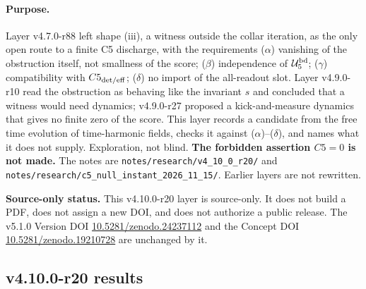 \paragraph{Purpose.}
Layer v4.7.0-r88 left shape (iii), a witness outside the collar iteration, as the only open route to a finite C5 discharge, with
the requirements (\(\alpha\)) vanishing of the obstruction itself, not smallness of the score; (\(\beta\)) independence of
\(\mathcal U_5^{\rm bd}\); (\(\gamma\)) compatibility with \(C5_{\rm det/eff}\); (\(\delta\)) no import of the all-readout slot.  Layer
v4.9.0-r10 read the obstruction as behaving like the invariant \(s\) and concluded that a witness would need dynamics; v4.9.0-r27
proposed a kick-and-measure dynamics that gives no finite zero of the score.  This layer records a candidate from the free time
evolution of time-harmonic fields, checks it against (\(\alpha\))--(\(\delta\)), and names what it does not supply.  Exploration, not
blind.  \textbf{The forbidden assertion \(C5=0\) is not made.}  The notes are
\texttt{notes/\allowbreak research/\allowbreak v4\_10\_0\_r20/} and
\texttt{notes/\allowbreak research/\allowbreak c5\_null\_instant\_2026\_11\_15/}.  Earlier layers are not rewritten.

\noindent\textbf{Source-only status.}
This v4.10.0-r20 layer is source-only.  It does not build a PDF, does not assign a new DOI,
and does not authorize a public release.  The v5.1.0 Version DOI
\href{https://doi.org/10.5281/zenodo.24237112}{10.5281/zenodo.24237112} and the Concept DOI
\href{https://doi.org/10.5281/zenodo.19210728}{10.5281/zenodo.19210728} are unchanged by it.

\subsection*{v4.10.0-r20 results}
\label{subsec:v4100-r20-results}


